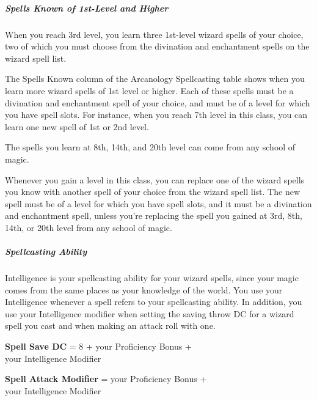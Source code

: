 \documentclass[letterpaper,openany,twoside,twocolumn]{book}
\begin{document}
	\subparagraph*{Spells Known of 1st-Level and Higher}
	When you reach 3rd level, you learn three 1st-level wizard spells of your choice, two of which you must choose from the divination and enchantment spells on the wizard spell list.
	
	The Spells Known column of the Arcanology Spellcasting table shows when you learn more wizard spells of 1st level or higher. Each of these spells must be a divination and enchantment spell of your choice, and must be of a level for which you have spell slots. For instance, when you reach 7th level in this class, you can learn one new spell of 1st or 2nd level.
	
	The spells you learn at 8th, 14th, and 20th level can come from any school of magic.
	
	Whenever you gain a level in this class, you can replace one of the wizard spells you know with another spell of your choice from the wizard spell list. The new spell must be of a level for which you have spell slots, and it must be a divination and enchantment spell, unless you’re replacing the spell you gained at 3rd, 8th, 14th, or 20th level from any school of magic.
	
	\subparagraph*{Spellcasting Ability}
	Intelligence is your spellcasting ability for your wizard spells, since your magic comes from the same places as your knowledge of the world. You use your Intelligence whenever a spell refers to your spellcasting ability. In addition, you use your Intelligence modifier when setting the saving throw DC for a wizard spell you cast and when making an attack roll with one.
	
	\begin{center}
		\textbf{Spell Save DC} = 8 + your Proficiency Bonus + \\your Intelligence Modifier
	\end{center}
	\begin{center}
		\textbf{Spell Attack Modifier} = your Proficiency Bonus + \\your Intelligence Modifier
	\end{center}
	
\end{document}
